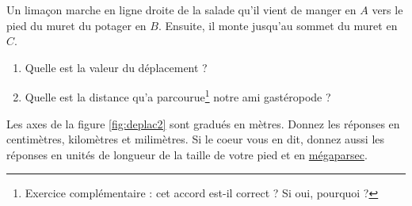 

\begin{exercice} \label{exo:deplac2}\label{exo005}
Un limaçon marche en ligne droite de la salade qu'il vient de manger en $A$ vers le pied du muret du potager en $B$. Ensuite, il monte jusqu'au sommet du muret en $C$.
\begin{enumerate}
\item Quelle est la valeur du déplacement ?
\item Quelle est la distance qu'a parcourue\footnote{Exercice complémentaire : cet accord est-il correct ? Si oui, pourquoi ?} notre ami gastéropode ?
\end{enumerate}
Les axes de la figure \ref{fig:deplac2} sont gradués en mètres. Donnez les réponses en centimètres, kilomètres et milimètres. Si le coeur vous en dit, donnez aussi les réponses en unités de longueur de la taille de votre pied et en \href{http://fr.wikipedia.org/wiki/M%C3%A9ga}{méga}\href{http://fr.wikipedia.org/wiki/Parsec}{parsec}.
\end{exercice}



